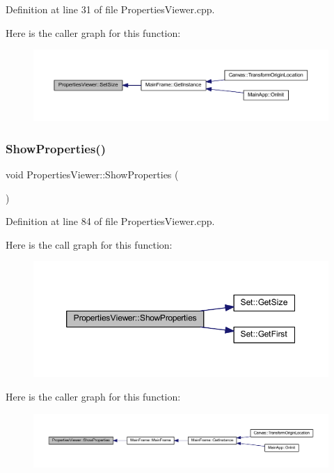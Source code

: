 Definition at line 31 of file Properties\+Viewer.\+cpp.

Here is the caller graph for this function\+:
\nopagebreak
\begin{figure}[H]
\begin{center}
\leavevmode
\includegraphics[width=350pt]{class_properties_viewer_a584378c78158525069fccc64ba446821_icgraph}
\end{center}
\end{figure}
\mbox{\label{class_properties_viewer_a728c21d8325941bfcee2599ea9edd9bc}} 
\subsubsection{\texorpdfstring{Show\+Properties()}{ShowProperties()}}
{\footnotesize\ttfamily void Properties\+Viewer\+::\+Show\+Properties (\begin{DoxyParamCaption}{ }\end{DoxyParamCaption})}



Definition at line 84 of file Properties\+Viewer.\+cpp.

Here is the call graph for this function\+:
\nopagebreak
\begin{figure}[H]
\begin{center}
\leavevmode
\includegraphics[width=350pt]{class_properties_viewer_a728c21d8325941bfcee2599ea9edd9bc_cgraph}
\end{center}
\end{figure}
Here is the caller graph for this function\+:
\nopagebreak
\begin{figure}[H]
\begin{center}
\leavevmode
\includegraphics[width=350pt]{class_properties_viewer_a728c21d8325941bfcee2599ea9edd9bc_icgraph}
\end{center}
\end{figure}


